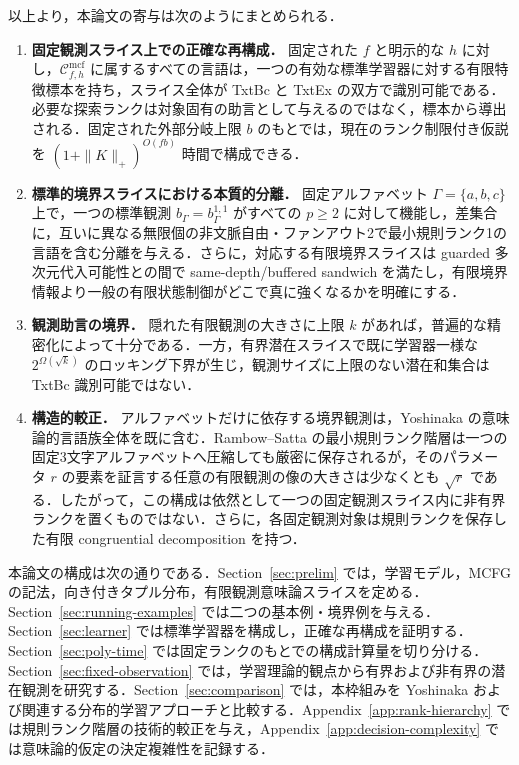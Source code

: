 \documentclass[11pt,a4paper]{ltjsarticle}
\numberwithin{equation}{section}
\theoremstyle{plain}
\theoremstyle{definition}
\theoremstyle{remark}
\newcommand{\Cmcf}[2]{\mathcal{C}^{\mathrm{mcf}}_{#1,#2}}
\begin{document}
以上より，本論文の寄与は次のようにまとめられる．
\begin{enumerate}[leftmargin=*]
\item \textbf{固定観測スライス上での正確な再構成．}
固定された $f$ と明示的な $h$ に対し，$\Cmcf{f}{h}$ に属するすべての言語は，一つの有効な標準学習器に対する有限特徴標本を持ち，スライス全体が TxtBc と TxtEx の双方で識別可能である．必要な探索ランクは対象固有の助言として与えるのではなく，標本から導出される．固定された外部分岐上限 $b$ のもとでは，現在のランク制限付き仮説を $(1+\|K\|_+)^{O(fb)}$ 時間で構成できる．
\item \textbf{標準的境界スライスにおける本質的分離．}
固定アルファベット $\Gamma=\{a,b,c\}$ 上で，一つの標準観測 $b_\Gamma=b_\Gamma^{1,1}$ がすべての $p\ge2$ に対して機能し，差集合に，互いに異なる無限個の非文脈自由・ファンアウト2で最小規則ランク1の言語を含む分離を与える．さらに，対応する有限境界スライスは guarded 多次元代入可能性との間で same-depth/buffered sandwich を満たし，有限境界情報より一般の有限状態制御がどこで真に強くなるかを明確にする．
\item \textbf{観測助言の境界．}
隠れた有限観測の大きさに上限 $k$ があれば，普遍的な精密化によって十分である．一方，有界潜在スライスで既に学習器一様な $2^{\Omega(\sqrt{k})}$ のロッキング下界が生じ，観測サイズに上限のない潜在和集合は TxtBc 識別可能ではない．
\item \textbf{構造的較正．}
アルファベットだけに依存する境界観測は，Yoshinaka の意味論的言語族全体を既に含む．Rambow--Satta の最小規則ランク階層は一つの固定3文字アルファベットへ圧縮しても厳密に保存されるが，そのパラメータ $r$ の要素を証言する任意の有限観測の像の大きさは少なくとも $\sqrt r$ である．したがって，この構成は依然として一つの固定観測スライス内に非有界ランクを置くものではない．さらに，各固定観測対象は規則ランクを保存した有限 congruential decomposition を持つ．
\end{enumerate}

本論文の構成は次の通りである．Section~\ref{sec:prelim} では，学習モデル，MCFG の記法，向き付きタプル分布，有限観測意味論スライスを定める．Section~\ref{sec:running-examples} では二つの基本例・境界例を与える．Section~\ref{sec:learner} では標準学習器を構成し，正確な再構成を証明する．Section~\ref{sec:poly-time} では固定ランクのもとでの構成計算量を切り分ける．Section~\ref{sec:fixed-observation} では，学習理論的観点から有界および非有界の潜在観測を研究する．Section~\ref{sec:comparison} では，本枠組みを Yoshinaka および関連する分布的学習アプローチと比較する．Appendix~\ref{app:rank-hierarchy} では規則ランク階層の技術的較正を与え，Appendix~\ref{app:decision-complexity} では意味論的仮定の決定複雑性を記録する．
\end{document}
